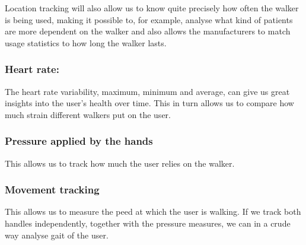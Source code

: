 Location tracking will also allow us to know quite precisely how often the walker is being used, making it possible to, for example, analyse what kind of patients are more dependent on the walker and also allows the manufacturers to match usage statistics to how long the walker lasts.

\subsubsection{Heart rate:}
The heart rate variability, maximum, minimum and average, can give us great insights into the user’s health over time. This in turn allows us to compare how much strain different walkers put on the user.

\subsubsection{Pressure applied by the hands}
This allows us to track how much the user relies on the walker.

\subsubsection{Movement tracking}
This allows us to measure the peed at which the user is walking. If we track both handles independently, together with the pressure measures, we can in a crude way analyse gait of the user.




